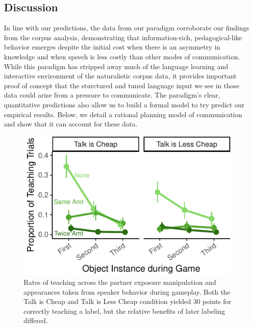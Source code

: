 \documentclass[10pt, letterpaper]{article}
\newenvironment{CodeChunk}{}{}
\begin{document}
\hypertarget{discussion-1}{%
\subsection{Discussion}\label{discussion-1}}

In line with our predictions, the data from our paradigm corroborate our
findings from the corpus analysis, demonstrating that information-rich,
pedagogical-like behavior emerges despite the initial cost when there is
an asymmetry in knowledge and when speech is less costly than other
modes of communication. While this paradigm has stripped away much of
the language learning and interactive environment of the naturalistic
corpus data, it provides important proof of concept that the sturctured
and tuned language input we see in those data could arise from a
pressure to communicate. The paradigm's clear, quantitative predictions
also allow us to build a formal model to try predict our empirical
results. Below, we detail a rational planning model of communication and
show that it can account for these data.

\begin{CodeChunk}
\begin{figure}[tb]
\includegraphics{figs/imp_teach-1} \caption[Rates of teaching across the partner exposure manipulation and appearances taken from speaker behavior during gameplay]{Rates of teaching across the partner exposure manipulation and appearances taken from speaker behavior during gameplay. Both the Talk is Cheap and Talk is Less Cheap condition yielded 30 points for correctly teaching a label, but the relative benefits of later labeling differed.}\label{fig:imp_teach}
\end{figure}
\end{CodeChunk}
\end{document}

